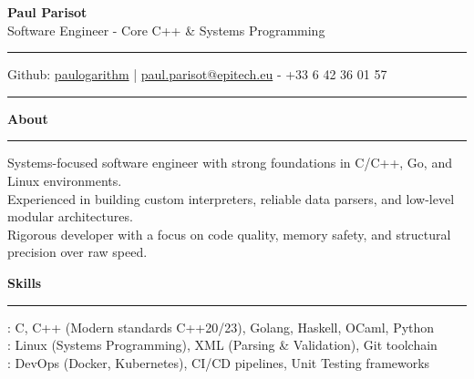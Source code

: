 \documentclass[9pt]{extarticle}
\begin{document}
\begin{center}
    {\huge\bfseries Paul Parisot}
    \\[10pt]
    {\Large Software Engineer - Core C++ \& Systems Programming}
    \\
\end{center}


\par\vspace{-10pt}
\rule{\linewidth}{0.4pt}
\par\vspace{-10pt}

\begin{center}
    Github: \href{https://github.com/paulogarithm}{paulogarithm} 
    \quad | \quad 
    \href{mailto:paul.parisot@epitech.eu}{paul.parisot@epitech.eu} - +33 6 42 36 01 57
\end{center}

\par\vspace{-15pt}
\rule{\linewidth}{0.4pt}
\par\vspace{5pt}


{\large\bfseries About}
\par\vspace{-8pt}
\rule{\linewidth}{0.4pt}
\par\vspace{5pt}

Systems-focused software engineer with strong foundations in C/C++, Go, and Linux environments. \\
Experienced in building custom interpreters, reliable data parsers, and low-level modular architectures. \\
Rigorous developer with a focus on code quality, memory safety, and structural precision over raw speed.
\par\vspace{5pt}


{\large\bfseries Skills}
\par\vspace{-8pt}
\rule{\linewidth}{0.4pt}
\par\vspace{5pt}

\hspace*{5pt}{\bfseries Core Languages}: C, C++ (Modern standards C++20/23), Golang, Haskell, OCaml, Python \\
\hspace*{5pt}{\bfseries Environment \& Formats}: Linux (Systems Programming), XML (Parsing \& Validation), Git toolchain \\
\hspace*{5pt}{\bfseries Infrastructure}: DevOps (Docker, Kubernetes), CI/CD pipelines, Unit Testing frameworks
\end{document}
